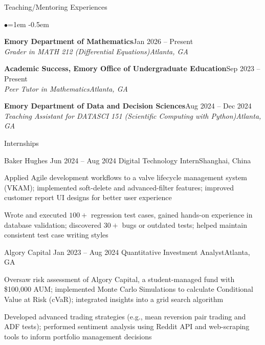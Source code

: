 \documentclass[10pt, letterpaper]{resume} %
\begin{document}
\begin{rSection}{Teaching/Mentoring Experiences}
\begin{list}{$\bullet$}{\leftmargin=1em}
   \itemsep -0.5em
\item \textbf{Emory Department of Mathematics}\hfill{Jan 2026 -- Present}\\\textit{Grader in MATH 212 (Differential Equations)}\hfill\textit{Atlanta, GA}
\item \textbf{Academic Success, Emory Office of Undergraduate Education}\hfill{Sep 2023 -- Present}\\\textit{Peer Tutor in Mathematics}\hfill\textit{Atlanta, GA}
\item \textbf{Emory Department of Data and Decision Sciences}\hfill{Aug 2024 -- Dec 2024}\\\textit{Teaching Assistant for DATASCI 151 (Scientific Computing with Python)}\hfill\textit{Atlanta, GA}
\end{list}
\end{rSection}

\begin{rSection}{Internships}
\begin{rSubsection}
	{Baker Hughes}
	{Jun 2024 -- Aug 2024}
	{Digital Technology Intern}{Shanghai, China}
	
	\item Applied Agile development workflows to a valve lifecycle management system (VKAM); implemented soft-delete and advanced-filter features; improved customer report UI designs for better user experience
	\item Wrote and executed $100+$ regression test cases, gained hands-on experience in database validation; discovered $30+$ bugs or outdated tests; helped maintain consistent test case writing styles
\end{rSubsection}

\begin{rSubsection}
	{Algory Capital}
	{Jan 2023 -- Aug 2024}
	{Quantitative Investment Analyst}{Atlanta, GA}
	
	\item Oversaw risk assessment of Algory Capital, a student-managed fund with \$100,000 AUM; implemented Monte Carlo Simulations to calculate Conditional Value at Risk (cVaR); integrated insights into a grid search algorithm
	\item Developed advanced trading strategies (e.g., mean reversion pair trading and ADF tests); performed sentiment analysis using Reddit API and web-scraping tools to inform portfolio management decisions
\end{rSubsection}
\end{rSection}
\end{document}
